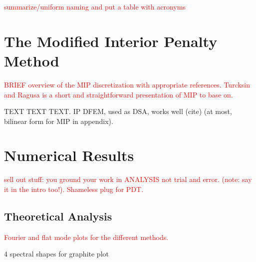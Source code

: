 \documentclass[preprint,10pt]{elsarticle}
\newcommand{\tcr}[1]{\textcolor{red}{#1}}
\begin{document}
\tcr{summarize/uniform naming and put a table with acronyms}

\section{The Modified Interior Penalty Method} \label{sec::MIP}

\tcr{BRIEF overview of the MIP discretization with appropriate references. Turcksin and Ragusa is a short and straightforward presentation of MIP to base on.}

TEXT TEXT TEXT. IP DFEM, used as DSA, works well (cite) (at most, bilinear form for MIP in appendix).

\section{Numerical Results} \label{sec::results}
\tcr{sell out stuff: you ground your work in ANALYSIS not trial and error. (note: say it in the intro too!). Shameless plug for PDT.}

\subsection{Theoretical Analysis}
\tcr{Fourier and flat mode plots for the different methods.}


4 spectral shapes for graphite plot
\end{document}
